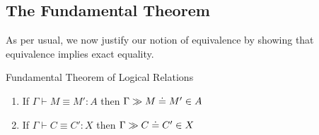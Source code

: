\documentclass[letterpaper]{article}
\begin{document}
\subsection{The Fundamental Theorem}
As per usual, we now justify our notion of equivalence by showing that equivalence implies exact equality. 
\begin{theorem} Fundamental Theorem of Logical Relations

    \begin{enumerate}
        \item If $\Gamma \vdash M \equiv M' : A$ then $\Gamma \gg M\mathrel{\doteq}M' \in A$
        \item If $\Gamma \vdash C \equiv C' : X$ then $\Gamma \gg C\mathrel{\doteq}C' \in X$
    \end{enumerate}
\end{theorem}
\end{document}
